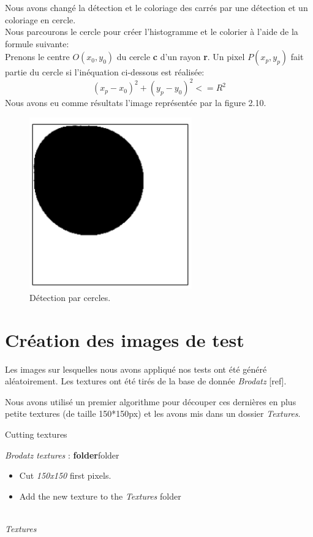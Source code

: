 \indent Nous avons changé la détection et le coloriage des carrés par une détection et un coloriage en cercle.\\
Nous parcourons le cercle pour créer l'histogramme et le colorier à l'aide de la formule suivante:\\
\indent Prenons le centre $O(x_0,y_0)$ du cercle \textbf{c} d'un rayon \textbf{r}.  Un pixel $P (x_p,y_p)$ fait partie du cercle si l'inéquation ci-dessous est réalisée:
$$(x_p-x_0)^2 + (y_p-y_0)^2 <= R^2$$
Nous avons eu comme résultats l'image représentée par la figure 2.10.

\begin{figure}[H]
	\centering
		\includegraphics[width=7cm,]{Figures/chap2/10.png}
		
	\caption[imgCercle]{Détection par cercles.}
	\label{fig:division}
\end{figure}


\section{Création des images de test}

\indent Les images sur lesquelles nous avons appliqué nos tests ont été généré aléatoirement. Les textures ont été tirés de la base de donnée \textit{Brodatz} [ref].

Nous avons utilisé un premier algorithme pour découper ces dernières en plus petite textures (de taille 150*150px) et les avons mis dans un dossier \textit{Textures}.

\label{algo decoupage}
\begin{algorithme}[H]
\caption{Cutting textures}
{\textit{Brodatz textures} : \textbf{folder}}{folder}
{
{
	\begin{itemize}
	\item Cut \textit{150x150} first pixels.
	\item Add the new texture to the \textit{Textures} folder
	\end{itemize}
}
\\
\Return \textit{Textures}
}
\end{algorithme}

